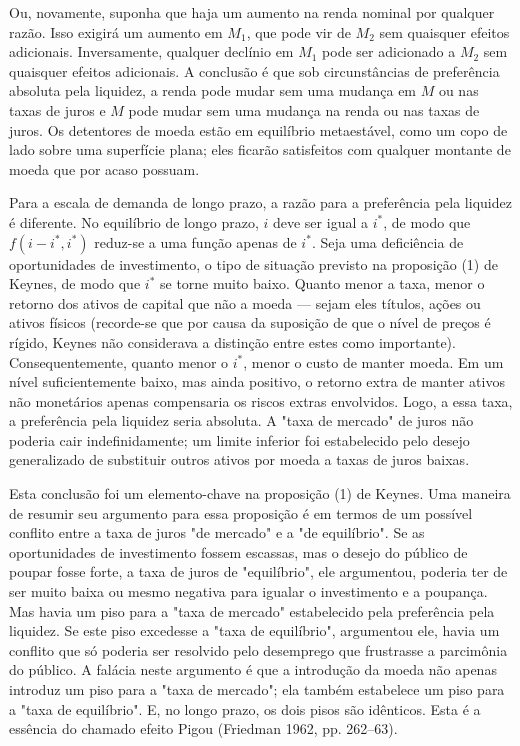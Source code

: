 \documentclass[12pt]{article}
\begin{document}
Ou, novamente, suponha que haja um aumento na renda nominal por qualquer razão. Isso exigirá um aumento em $M_1$, que pode vir de $M_2$ sem quaisquer efeitos adicionais. Inversamente, qualquer declínio em $M_1$ pode ser adicionado a $M_2$ sem quaisquer efeitos adicionais. A conclusão é que sob circunstâncias de preferência absoluta pela liquidez, a renda pode mudar sem uma mudança em $M$ ou nas taxas de juros e $M$ pode mudar sem uma mudança na renda ou nas taxas de juros. Os detentores de moeda estão em equilíbrio metaestável, como um copo de lado sobre uma superfície plana; eles ficarão satisfeitos com qualquer montante de moeda que por acaso possuam.

Para a escala de demanda de longo prazo, a razão para a preferência pela liquidez é diferente. No equilíbrio de longo prazo, $i$ deve ser igual a $i^*$, de modo que $f(i - i^*, i^*)$ reduz-se a uma função apenas de $i^*$. Seja uma deficiência de oportunidades de investimento, o tipo de situação previsto na proposição (1) de Keynes, de modo que $i^*$ se torne muito baixo. Quanto menor a taxa, menor o retorno dos ativos de capital que não a moeda — sejam eles títulos, ações ou ativos físicos (recorde-se que por causa da suposição de que o nível de preços é rígido, Keynes não considerava a distinção entre estes como importante). Consequentemente, quanto menor o $i^*$, menor o custo de manter moeda. Em um nível suficientemente baixo, mas ainda positivo, o retorno extra de manter ativos não monetários apenas compensaria os riscos extras envolvidos. Logo, a essa taxa, a preferência pela liquidez seria absoluta. A "taxa de mercado" de juros não poderia cair indefinidamente; um limite inferior foi estabelecido pelo desejo generalizado de substituir outros ativos por moeda a taxas de juros baixas.

Esta conclusão foi um elemento-chave na proposição (1) de Keynes. Uma maneira de resumir seu argumento para essa proposição é em termos de um possível conflito entre a taxa de juros "de mercado" e a "de equilíbrio". Se as oportunidades de investimento fossem escassas, mas o desejo do público de poupar fosse forte, a taxa de juros de "equilíbrio", ele argumentou, poderia ter de ser muito baixa ou mesmo negativa para igualar o investimento e a poupança. Mas havia um piso para a "taxa de mercado" estabelecido pela preferência pela liquidez. Se este piso excedesse a "taxa de equilíbrio", argumentou ele, havia um conflito que só poderia ser resolvido pelo desemprego que frustrasse a parcimônia do público. A falácia neste argumento é que a introdução da moeda não apenas introduz um piso para a "taxa de mercado"; ela também estabelece um piso para a "taxa de equilíbrio". E, no longo prazo, os dois pisos são idênticos. Esta é a essência do chamado efeito Pigou (Friedman 1962, pp. 262–63).
\end{document}
